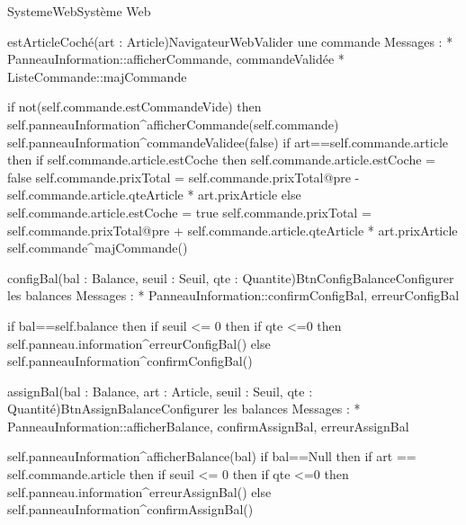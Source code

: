 \begin{OM}{SystemeWeb}{Système Web}
\begin{OMOperation}{estArticleCoché(art : Article)}{NavigateurWeb}{Valider une commande}
Messages :
* PanneauInformation::{afficherCommande, commandeValidée}
* ListeCommande::{majCommande}
\begin{OMPre}
\end{OMPre}
\begin{OMPost}
if not(self.commande.estCommandeVide) then
                self.panneauInformation^afficherCommande(self.commande)
                self.panneauInformation^commandeValidee(false)
                if art==self.commande.article then
                        if self.commande.article.estCoche then
                                self.commande.article.estCoche = false
                                self.commande.prixTotal = self.commande.prixTotal@pre -
self.commande.article.qteArticle * art.prixArticle
                        else
                                self.commande.article.estCoche = true
                                self.commande.prixTotal = self.commande.prixTotal@pre +
self.commande.article.qteArticle * art.prixArticle
                        self.commande^majCommande()
                    \end{OMPost}
\end{OMOperation}

\begin{OMOperation}{configBal(bal : Balance, seuil : Seuil, qte : Quantite)}{BtnConfigBalance}{Configurer les balances}
Messages :
* PanneauInformation::{confirmConfigBal, erreurConfigBal}
\begin{OMPre}
\end{OMPre}
\begin{OMPost}
        if bal==self.balance then
                if seuil <= 0 then
                        if qte <=0 then
                                self.panneau.information^erreurConfigBal()
        else
                self.panneauInformation^confirmConfigBal()
            \end{OMPost}
\end{OMOperation}

\begin{OMOperation}{assignBal(bal : Balance, art : Article, seuil : Seuil, qte : Quantité)}{BtnAssignBalance}{Configurer les balances}
Messages :
* PanneauInformation::{afficherBalance, confirmAssignBal, erreurAssignBal}
\begin{OMPre}
\end{OMPre}
\begin{OMPost}
        self.panneauInformation^afficherBalance(bal)
        if bal==Null then
                if art == self.commande.article then
                        if seuil <= 0 then
                                if qte <=0 then
                                        self.panneau.information^erreurAssignBal()
        else
                self.panneauInformation^confirmAssignBal()
            \end{OMPost}
\end{OMOperation}
\end{OM}
